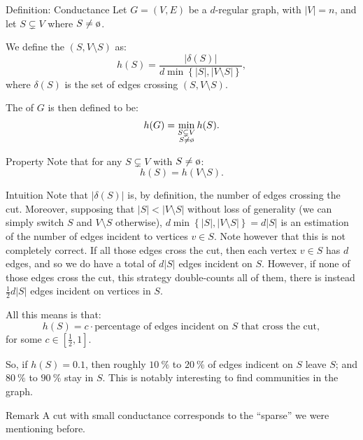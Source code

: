 \documentclass[a4paper]{article}
\begin{document}
\begin{parag}{Definition: Conductance}
    Let $G = \left(V, E\right)$ be a $d$-regular graph, with $\left|V\right| = n$, and let $S \subsetneq V$ where $S \neq \o$.

    We define the  $\left(S, V \setminus S\right)$ as: 
    \[h\left(S\right) = \frac{\left|\delta\left(S\right)\right|}{d \min\left\{\left|S\right|, \left|V \setminus S\right|\right\}},\]
    where $\delta\left(S\right)$ is the set of edges crossing $\left(S, V \setminus S\right)$.

    The  of $G$ is then defined to be: 
    \[h\left(G\right) = \min_{\substack{S \subsetneq V \\ S \neq \o}} h\left(S\right).\]

    \begin{subparag}{Property}
        Note that for any $S \subsetneq V$ with $S \neq \o$: 
        \[h\left(S\right) = h\left(V \setminus S\right).\]
    \end{subparag}
    
    \begin{subparag}{Intuition}
        Note that $\left|\delta\left(S\right)\right|$ is, by definition, the number of edges crossing the cut. Moreover, supposing that $\left|S\right| < \left|V \setminus S\right|$ without loss of generality (we can simply switch $S$ and $V \setminus S$ otherwise), $d \min\left\{\left|S\right|, \left|V \setminus S\right|\right\} = d \left|S\right|$ is an estimation of the number of edges incident to vertices $v \in S$. Note however that this is not completely correct. If all those edges cross the cut, then each vertex $v \in S$ has $d$ edges, and so we do have a total of $d \left|S\right|$ edges incident on $S$. However, if none of those edges cross the cut, this strategy double-counts all of them, there is instead $\frac{1}{2} d\left|S\right|$ edges incident on vertices in $S$. 

        All this means is that: 
        \[h\left(S\right) = c\cdot \text{percentage of edges incident on $S$ that cross the cut},\]
        for some $c \in \left[\frac{1}{2}, 1\right]$.
        
        So, if $h\left(S\right) = 0.1$, then roughly $\SI{10}{\%}$ to $\SI{20}{\%}$ of edges indicent on $S$ leave $S$; and $\SI{80}{\%}$ to $\SI{90}{\%}$ stay in $S$. This is notably interesting to find communities in the graph.
    \end{subparag}

    \begin{subparag}{Remark}
        A cut with small conductance corresponds to the ``sparse'' we were mentioning before.
    \end{subparag}
\end{parag} 
\end{document}
